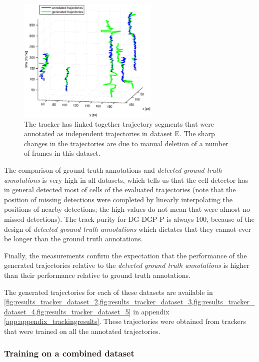 		\begin{figure}[h]
			\centering				\includegraphics[width=0.6\textwidth]{images/fig_results_tracking_analysis_4}
			\caption{The tracker has linked together trajectory segments that were annotated as independent trajectories in dataset E. The sharp changes in the trajectories are due to manual deletion of a number of frames in this dataset.}
			\label{fig:results_tracking_analysisD}
		\end{figure}
		
		The comparison of ground truth annotations and \textit{detected ground truth annotations} is very high in all datasets, which tells us that the cell detector has in general detected most of cells of the evaluated trajectories (note that the position of missing detections were completed by linearly interpolating the positions of nearby detections; the high values do not mean that were almost no missed detections). The track purity for DG-DGP-P is always 100, because of the design of \textit{detected ground truth annotations} which dictates that they cannot ever be longer than the ground truth annotations.
		
		Finally, the measurements confirm the expectation that the performance of the generated trajectories relative to the \textit{detected ground truth annotations} is higher than their performance relative to ground truth annotations.
		
		The generated trajectories for each of these datasets are available in \cref{fig:results_tracker_dataset_2,fig:results_tracker_dataset_3,fig:results_tracker_dataset_4,fig:results_tracker_dataset_5} in appendix \ref{app:appendix_trackingresults}. These trajectories were obtained from trackers that were trained on all the annotated trajectories.
		
		\subsubsection{Training on a combined dataset}
		
